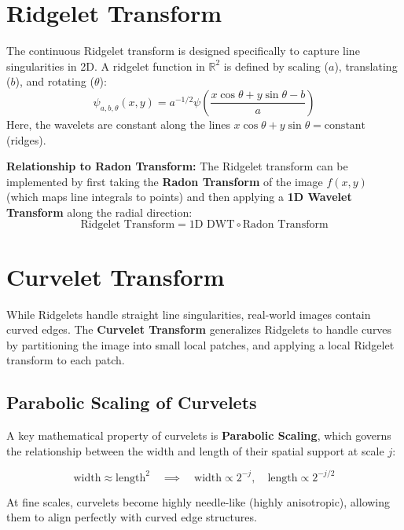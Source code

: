 \documentclass[12pt,a4paper]{article}
\begin{document}
\section{Ridgelet Transform}

The continuous Ridgelet transform is designed specifically to capture line singularities in 2D. A ridgelet function in $\mathbb{R}^2$ is defined by scaling ($a$), translating ($b$), and rotating ($\theta$):
$$\psi_{a,b,\theta}(x, y) = a^{-1/2} \psi\left(\frac{x \cos\theta + y \sin\theta - b}{a}\right)$$
Here, the wavelets are constant along the lines $x \cos\theta + y \sin\theta = \text{constant}$ (ridges).

\textbf{Relationship to Radon Transform:}
The Ridgelet transform can be implemented by first taking the \textbf{Radon Transform} of the image $f(x,y)$ (which maps line integrals to points) and then applying a \textbf{1D Wavelet Transform} along the radial direction:
$$\text{Ridgelet Transform} = \text{1D DWT} \circ \text{Radon Transform}$$

\section{Curvelet Transform}

While Ridgelets handle straight line singularities, real-world images contain curved edges. The \textbf{Curvelet Transform} generalizes Ridgelets to handle curves by partitioning the image into small local patches, and applying a local Ridgelet transform to each patch.

\subsection{Parabolic Scaling of Curvelets}
A key mathematical property of curvelets is \textbf{Parabolic Scaling}, which governs the relationship between the width and length of their spatial support at scale $j$:
\begin{tcolorbox}[formulabox, title={\textbf{Parabolic Scaling Law}}]
$$\text{width} \approx \text{length}^2 \quad \implies \quad \text{width} \propto 2^{-j}, \quad \text{length} \propto 2^{-j/2}$$
\end{tcolorbox}
At fine scales, curvelets become highly needle-like (highly anisotropic), allowing them to align perfectly with curved edge structures.
\end{document}
